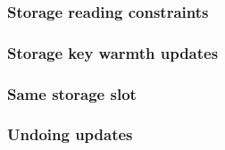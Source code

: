 \subsubsection{Storage reading constraints \lispDone{}}       \label{hub: storage: specialized: reading}             
\subsubsection{Storage key warmth updates \lispDone{}}        \label{hub: storage: specialized: warmth}             
\subsubsection{Same storage slot \lispDone{}}                 \label{hub: storage: specialized: same slot}          
\subsubsection{Undoing updates \lispDone{}}                   \label{hub: storage: specialized: undoing}            
